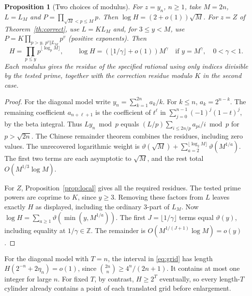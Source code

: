 \documentclass[11pt]{article}
\newtheorem{proposition}[theorem]{Proposition}
\newcommand{\Z}{\mathbb Z}
\begin{document}
\begin{proposition}[Two choices of modulus]\label{prop:lift}
For $z=y_n$, $n\ge1$, take $M=2n$, $L=L_M$ and
$P=\prod_{\sqrt M<p\le M}p$. Then $\log H=(2+o(1))\sqrt M$.
For $z=Z$ of Theorem~\ref{th:correct}, use $L=K L_M$ and, for
$3\le y<M$, use $P=K\prod_{p>y,\ p^v\Vert L_M}p^v$ (positive exponents).
Then
\[
 H=\prod_{p\le y}p^{\lfloor\log_p M\rfloor},\qquad
 \log H=(\lfloor1/\gamma\rfloor+o(1))M^\gamma\quad
 \text{if }y=M^\gamma,\quad 0<\gamma<1 .
\]
Each modulus gives the residue of the specified rational using only indices
divisible by the tested prime, together with the correction residue modulo
$K$ in the second case.
\end{proposition}
\begin{proof}
For the diagonal model write $y_n=\sum_{k=1}^{2n} a_k/k$. For $k\le n$,
$a_k=2^{n-k}$. The remaining coefficient $a_{n+\ell+1}$ is the coefficient
of $t^\ell$ in $\sum_{j=0}^{n-1}(-1)^j(1-t)^j$, by the beta integral.
Thus $Ly_n\bmod p$ equals $(L/p)\sum_{i\le2n/p}a_{pi}/i\bmod p$ for
$p>\sqrt{2n}$. The Chinese remainder theorem combines the residues, including
zero values. The unrecovered logarithmic weight is
$\vartheta(\sqrt M)+\sum_{a=2}^{\lfloor\log_2 M\rfloor}\vartheta(M^{1/a})$.
The first two terms are each asymptotic to $\sqrt M$, and the rest total
$O(M^{1/3}\log M)$.

For $Z$, Proposition~\ref{prop:local} gives all the required residues.
The tested prime powers are coprime to $K$, since $y\ge3$. Removing these
factors from $L$ leaves exactly $H$ as displayed, including the ordinary
$3$-part of $L_M$. Now
$\log H=\sum_{a\ge1}\vartheta(\min(y,M^{1/a}))$. The first
$J=\lfloor1/\gamma\rfloor$ terms equal $\vartheta(y)$, including equality
at $1/\gamma\in\Z$. The remainder is $O(M^{1/(J+1)}\log M)=o(y)$.
\end{proof}

For the diagonal model with $T=n$, the interval in \eqref{eq:grid} has length
$H(2^{-n}+2\eta_n)=o(1)$, since $\binom{2n}{n}\ge 4^n/(2n+1)$.
It contains at most one integer for large $n$. For fixed $T$, by contrast,
$H\ge 2^T$ eventually, so every length-$T$ cylinder already contains a
point of each translated grid before enlargement.
\end{document}

